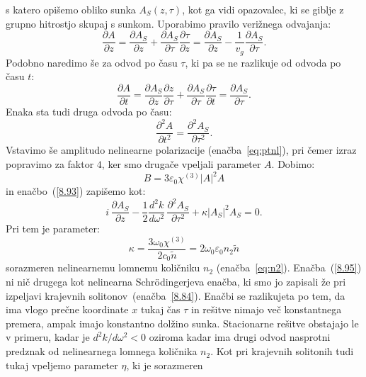s katero opišemo obliko sunka $A_S(z,\tau)$, kot ga vidi opazovalec, ki se giblje
z grupno hitrostjo skupaj s sunkom. Uporabimo pravilo verižnega odvajanja:
\begin{equation}
\frac{\partial A}{\partial z} = \frac{\partial A_S}{\partial z} + \frac{\partial A_S}{\partial \tau}
\frac{\partial \tau}{\partial z}
= \frac{\partial A_S}{\partial z} -\frac{1}{v_g} \frac{\partial A_S}{\partial \tau}.
\end{equation}
Podobno naredimo še za odvod po času $\tau$, ki pa se ne razlikuje od odvoda po času $t$:
\begin{equation}
\frac{\partial A}{\partial t} = \frac{\partial A_S}{\partial z}\frac{\partial z}{\partial \tau}+
\frac{\partial A_S}{\partial \tau}\frac{\partial \tau}{\partial t} 
= \frac{\partial A_S}{\partial \tau}.
\end{equation}
Enaka sta tudi druga odvoda po času:
\begin{equation}
\frac{\partial^2 A}{\partial t^2} = \frac{\partial^2 A_S}{\partial\tau^2}.
\end{equation}
Vstavimo še amplitudo nelinearne polarizacije (enačba~\ref{eq:ptnl}), pri čemer izraz popravimo
za faktor $4$, ker smo drugače vpeljali parameter $A$. Dobimo:
\begin{equation}
B = 3\varepsilon_0\chi^{(3)} |A|^2 A
\end{equation}
in enačbo~(\ref{8.93}) zapišemo kot:
\begin{equation}
i\,\frac{\partial A_S}{\partial z}-\frac{1}{2}\frac{d^{2}k}{d\omega^{2}}\,
\frac{\partial^{2}A_S}{\partial\tau^{2}}+\kappa\left|A_S\right|^{2}A_S=0.
\label{8.95}
\end{equation}
Pri tem je parameter:
\begin{equation}
\kappa = \frac{3\omega_0\chi^{(3)}}{2c_0 \tilde{n}} = 2 \omega_0 \varepsilon_0 n_2 \tilde{n}
\end{equation}
sorazmeren nelinearnemu lomnemu količniku $n_2$ 
(enačba~\ref{eq:n2}). Enačba~(\ref{8.95}) ni nič drugega kot nelinearna Schr\"odingerjeva 
enačba, ki smo jo 
zapisali že pri izpeljavi krajevnih solitonov~(enačba~\ref{8.84}). Enačbi se razlikujeta po tem, da
ima vlogo prečne koordinate $x$ tukaj čas $\tau$ in rešitve nimajo več konstantnega premera,
ampak imajo konstantno dolžino sunka. Stacionarne rešitve obstajajo le v primeru, kadar je  $d^{2}k/d\omega^{2}<0$ oziroma kadar ima drugi odvod nasprotni predznak od nelinearnega lomnega količnika $n_2$. Kot pri krajevnih solitonih tudi tukaj vpeljemo parameter $\eta$, ki je sorazmeren 
